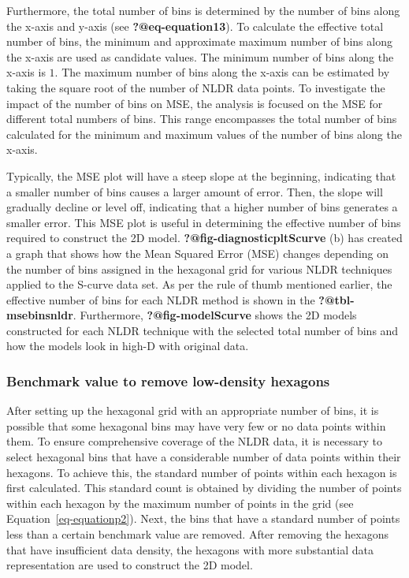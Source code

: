 \documentclass[
  12pt]{article}
\begin{document}
Furthermore, the total number of bins is determined by the number of
bins along the x-axis and y-axis (see \textbf{?@eq-equation13}). To
calculate the effective total number of bins, the minimum and
approximate maximum number of bins along the x-axis are used as
candidate values. The minimum number of bins along the x-axis is \(1\).
The maximum number of bins along the x-axis can be estimated by taking
the square root of the number of NLDR data points. To investigate the
impact of the number of bins on MSE, the analysis is focused on the MSE
for different total numbers of bins. This range encompasses the total
number of bins calculated for the minimum and maximum values of the
number of bins along the x-axis.

Typically, the MSE plot will have a steep slope at the beginning,
indicating that a smaller number of bins causes a larger amount of
error. Then, the slope will gradually decline or level off, indicating
that a higher number of bins generates a smaller error. This MSE plot is
useful in determining the effective number of bins required to construct
the 2D model. \textbf{?@fig-diagnosticpltScurve} (b) has created a graph
that shows how the Mean Squared Error (MSE) changes depending on the
number of bins assigned in the hexagonal grid for various NLDR
techniques applied to the S-curve data set. As per the rule of thumb
mentioned earlier, the effective number of bins for each NLDR method is
shown in the \textbf{?@tbl-msebinsnldr}. Furthermore,
\textbf{?@fig-modelScurve} shows the 2D models constructed for each NLDR
technique with the selected total number of bins and how the models look
in high-D with original data.

\hypertarget{benchmark-value-to-remove-low-density-hexagons}{%
\subsubsection{Benchmark value to remove low-density
hexagons}\label{benchmark-value-to-remove-low-density-hexagons}}

After setting up the hexagonal grid with an appropriate number of bins,
it is possible that some hexagonal bins may have very few or no data
points within them. To ensure comprehensive coverage of the NLDR data,
it is necessary to select hexagonal bins that have a considerable number
of data points within their hexagons. To achieve this, the standard
number of points within each hexagon is first calculated. This standard
count is obtained by dividing the number of points within each hexagon
by the maximum number of points in the grid (see
Equation~\ref{eq-equationp2}). Next, the bins that have a standard
number of points less than a certain benchmark value are removed. After
removing the hexagons that have insufficient data density, the hexagons
with more substantial data representation are used to construct the 2D
model.
\end{document}
